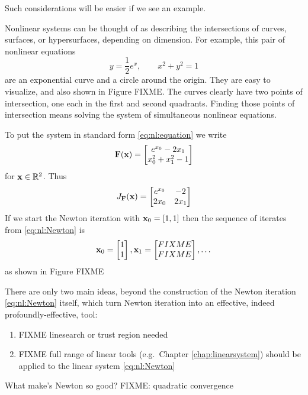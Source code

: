 Such considerations will be easier if we see an example.

\medskip\noindent\hrulefill
\begin{example}  Nonlinear systems can be thought of as describing the intersections of curves, surfaces, or hypersurfaces, depending on dimension.  For example, this pair of nonlinear equations
    $$y = \frac{1}{2} e^x, \qquad x^2+y^2 = 1$$
are an exponential curve and a circle around the origin.  They are easy to visualize, and also shown in Figure FIXME.  The curves clearly have two points of intersection, one each in the first and second quadrants.  Finding those points of intersection means solving the system of simultaneous nonlinear equations.

To put the system in standard form \eqref{eq:nl:equation} we write
\begin{equation}
\mathbf{F}(\mathbf{x}) = \begin{bmatrix}
           e^{x_0} - 2 x_1 \\
           x_0^2 + x_1^2 - 1
           \end{bmatrix}
\end{equation}
for $\mathbf{x}\in \mathbb{R}^2$.  Thus
\begin{equation}
J_{\mathbf{F}}(\mathbf{x}) = \begin{bmatrix}
    e^{x_0} & -2 \\
    2 x_0   & 2 x_1 \end{bmatrix}
\end{equation}
If we start the Newton iteration with $\mathbf{x}_0 = [1,1]$ then the sequence of iterates from \eqref{eq:nl:Newton} is
    $${\mathbf{x}}_{0} = \begin{bmatrix} 1 \\ 1 \end{bmatrix}, {\mathbf{x}}_{1} = \begin{bmatrix} FIXME \\ FIXME \end{bmatrix}, \dots$$
as shown in Figure FIXME
\end{example}
\noindent\hrulefill

\medskip
There are only two main ideas, beyond the construction of the Newton iteration \eqref{eq:nl:Newton} itself, which turn Newton iteration into an effective, indeed profoundly-effective, tool:
\renewcommand{\labelenumi}{\roman{enumi})}
\begin{enumerate}
\item FIXME linesearch or trust region needed \citep{Kelley2003}
\item FIXME full range of linear tools (e.g.~Chapter \ref{chap:linearsystem}) should be applied to the linear system \eqref{eq:nl:Newton}
\end{enumerate}

What make's Newton so good?  FIXME: quadratic convergence


